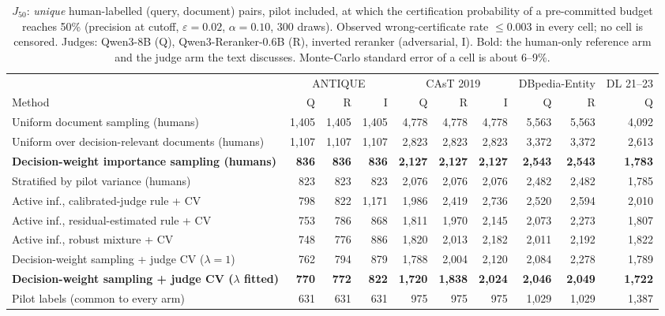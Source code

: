 \documentclass{article}
\newcommand{\eps}{\varepsilon}
\newcommand{\Jfifty}{J_{50}}
\begin{document}
\begin{table}[t]\centering\scriptsize\setlength{\tabcolsep}{2.2pt}
\caption{$\Jfifty$: \emph{unique} human-labelled (query, document) pairs, pilot included, at which the certification probability of a pre-committed budget reaches 50\% (precision at cutoff, $\eps=0.02$, $\alpha=0.10$, 300 draws). Observed wrong-certificate rate $\le0.003$ in every cell; no cell is censored. Judges: Qwen3-8B (Q), Qwen3-Reranker-0.6B (R), inverted reranker (adversarial, I). Bold: the human-only reference arm and the judge arm the text discusses. Monte-Carlo standard error of a cell is about 6--9\%.}\label{tab:J50}
\begin{tabular}{l rrr rrr rr r}\toprule
 & \multicolumn{3}{c}{ANTIQUE} & \multicolumn{3}{c}{CAsT 2019} & \multicolumn{2}{c}{DBpedia-Entity} & DL 21--23\\
Method & Q & R & I & Q & R & I & Q & R & Q\\\midrule
Uniform document sampling (humans) & 1,405 & 1,405 & 1,405 & 4,778 & 4,778 & 4,778 & 5,563 & 5,563 & 4,092\\
Uniform over decision-relevant documents (humans) & 1,107 & 1,107 & 1,107 & 2,823 & 2,823 & 2,823 & 3,372 & 3,372 & 2,613\\
\textbf{Decision-weight importance sampling (humans)} & \textbf{836} & \textbf{836} & \textbf{836} & \textbf{2,127} & \textbf{2,127} & \textbf{2,127} & \textbf{2,543} & \textbf{2,543} & \textbf{1,783}\\
Stratified by pilot variance (humans) & 823 & 823 & 823 & 2,076 & 2,076 & 2,076 & 2,482 & 2,482 & 1,785\\
Active inf., calibrated-judge rule + CV & 798 & 822 & 1,171 & 1,986 & 2,419 & 2,736 & 2,520 & 2,594 & 2,010\\
Active inf., residual-estimated rule + CV & 753 & 786 & 868 & 1,811 & 1,970 & 2,145 & 2,073 & 2,273 & 1,807\\
Active inf., robust mixture + CV & 748 & 776 & 886 & 1,820 & 2,013 & 2,182 & 2,011 & 2,192 & 1,822\\
Decision-weight sampling + judge CV ($\lambda=1$) & 762 & 794 & 879 & 1,788 & 2,004 & 2,120 & 2,084 & 2,278 & 1,789\\
\textbf{Decision-weight sampling + judge CV ($\lambda$ fitted)} & \textbf{770} & \textbf{772} & \textbf{822} & \textbf{1,720} & \textbf{1,838} & \textbf{2,024} & \textbf{2,046} & \textbf{2,049} & \textbf{1,722}\\\midrule
Pilot labels (common to every arm) & 631 & 631 & 631 & 975 & 975 & 975 & 1,029 & 1,029 & 1,387\\\bottomrule
\end{tabular}
\end{table}
\end{document}
